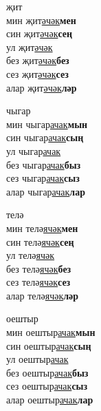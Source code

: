 \begin{multicols}{4}
\begin{enumerate}
\begin{minipage}{\linewidth}
    \item
    җит\\
    мин җит\underline{әчәк}\textbf{мен}\\
    син җит\underline{әчәк}\textbf{сең}\\
    ул җит\underline{әчәк}\\
    без җит\underline{әчәк}\textbf{без}\\
    сез җит\underline{әчәк}\textbf{сез}\\
    алар җит\underline{әчәк}\textbf{ләр}\\
\end{minipage}

\begin{minipage}{\linewidth}
    \item
    чыгар\\
    мин чыгар\underline{ачак}\textbf{мын}\\
    син чыгар\underline{ачак}\textbf{сың}\\
    ул чыгар\underline{ачак}\\
    без чыгар\underline{ачак}\textbf{быз}\\
    сез чыгар\underline{ачак}\textbf{сыз}\\
    алар чыгар\underline{ачак}\textbf{лар}\\
\end{minipage}

\begin{minipage}{\linewidth}
    \item
    телә\\
    мин телә\underline{ячәк}\textbf{мен}\\
    син телә\underline{ячәк}\textbf{сең}\\
    ул телә\underline{ячәк}\\
    без телә\underline{ячәк}\textbf{без}\\
    сез телә\underline{ячәк}\textbf{сез}\\
    алар телә\underline{ячәк}\textbf{ләр}\\
\end{minipage}

\begin{minipage}{\linewidth}
    \item
    оештыр\\
    мин оештыр\underline{ачак}\textbf{мын}\\
    син оештыр\underline{ачак}\textbf{сың}\\
    ул оештыр\underline{ачак}\\
    без оештыр\underline{ачак}\textbf{быз}\\
    сез оештыр\underline{ачак}\textbf{сыз}\\
    алар оештыр\underline{ачак}\textbf{лар}\\
\end{minipage}


\end{enumerate}
\end{multicols}

